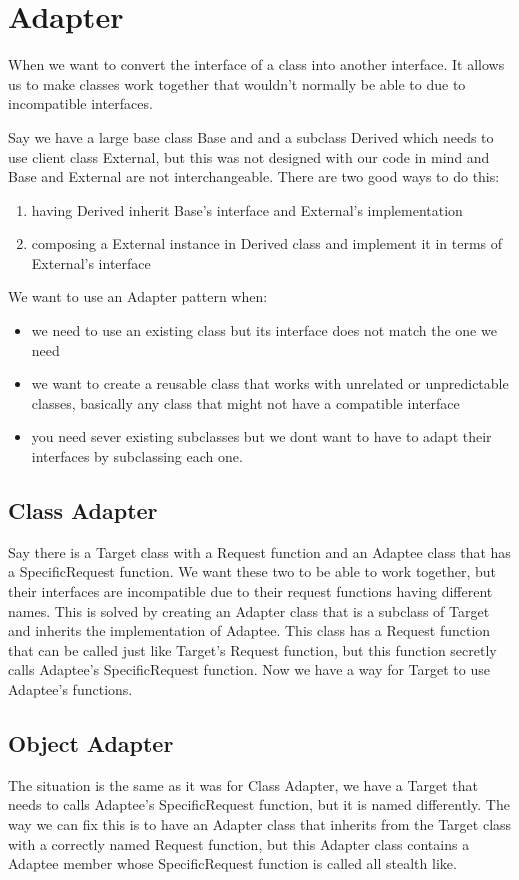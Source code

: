 \documentclass[12pt]{article}
\begin{document}
\section*{Adapter}
When we want to convert the interface of a class into another interface. It allows us to make classes work together that wouldn't normally be able to due to incompatible interfaces.

Say we have a large base class Base and and a subclass Derived which needs to use client class External, but this was not designed with our code in mind and Base and External are not interchangeable. There are two good ways to do this:
\begin{enumerate}
    \item having Derived inherit Base's interface and External's implementation
    \item composing a External instance in Derived class and implement it in terms of External's interface
 \end{enumerate}

We want to use an Adapter pattern when:
\begin{itemize}
    \item we need to use an existing class but its interface does not match the one we need
    \item we want to create a reusable class that works with unrelated or unpredictable classes, basically any class that might not have a compatible interface
    \item you need sever existing subclasses but we dont want to have to adapt their interfaces by subclassing each one.
\end{itemize}

\subsection*{Class Adapter}
Say there is a Target class with a Request function and an Adaptee class that has a SpecificRequest function. We want these two to be able to work together, but their interfaces are incompatible due to their request functions having different names. This is solved by creating an Adapter class that is a subclass of Target and inherits the implementation of Adaptee. This class has a Request function that can be called just like Target's Request function, but this function secretly calls Adaptee's SpecificRequest function. Now we have a way for Target to use Adaptee's functions.

\subsection*{Object Adapter}
The situation is the same as it was for Class Adapter, we have a Target that needs to calls Adaptee's SpecificRequest function, but it is named differently. The way we can fix this is to have an Adapter class that inherits from the Target class with a correctly named Request function, but this Adapter class contains a Adaptee member whose SpecificRequest function is called all stealth like.
\end{document}

